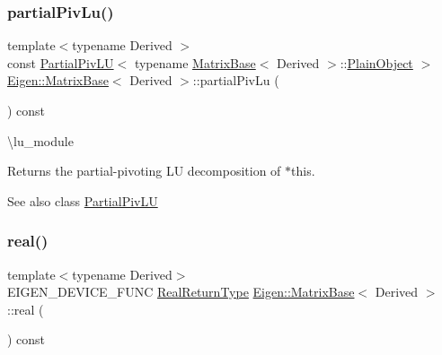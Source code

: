 \subsubsection{\texorpdfstring{partialPivLu()}{partialPivLu()}}
{\footnotesize\ttfamily template$<$typename Derived $>$ \\
const \mbox{\hyperlink{class_eigen_1_1_partial_piv_l_u}{Partial\+Piv\+LU}}$<$ typename \mbox{\hyperlink{class_eigen_1_1_matrix_base}{Matrix\+Base}}$<$ Derived $>$\+::\mbox{\hyperlink{class_eigen_1_1_dense_base_aae45af9b5aca5a9caae98fd201f47cc4}{Plain\+Object}} $>$ \mbox{\hyperlink{class_eigen_1_1_matrix_base}{Eigen\+::\+Matrix\+Base}}$<$ Derived $>$\+::partial\+Piv\+Lu (\begin{DoxyParamCaption}{ }\end{DoxyParamCaption}) const\hspace{0.3cm}{\ttfamily [inline]}}

\textbackslash{}lu\+\_\+module

\begin{DoxyReturn}{Returns}
the partial-\/pivoting LU decomposition of {\ttfamily $\ast$this}.
\end{DoxyReturn}
\begin{DoxySeeAlso}{See also}
class \mbox{\hyperlink{class_eigen_1_1_partial_piv_l_u}{Partial\+Piv\+LU}} 
\end{DoxySeeAlso}
\mbox{\label{class_eigen_1_1_matrix_base_a1be92242289c25a366fa2299b139e6fc}} 
\subsubsection{\texorpdfstring{real()}{real()}\hspace{0.1cm}{\footnotesize\ttfamily [1/2]}}
{\footnotesize\ttfamily template$<$typename Derived$>$ \\
E\+I\+G\+E\+N\+\_\+\+D\+E\+V\+I\+C\+E\+\_\+\+F\+U\+NC \mbox{\hyperlink{struct_eigen_1_1internal_1_1true__type}{Real\+Return\+Type}} \mbox{\hyperlink{class_eigen_1_1_matrix_base}{Eigen\+::\+Matrix\+Base}}$<$ Derived $>$\+::real (\begin{DoxyParamCaption}{ }\end{DoxyParamCaption}) const\hspace{0.3cm}{\ttfamily [inline]}}


